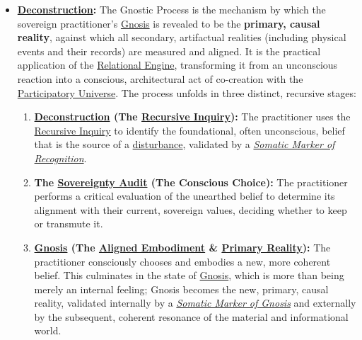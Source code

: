     \begin{itemize}
        \item \textbf{\hyperlink{gloss:deconstruction}{Deconstruction}:} The Gnostic Process is the mechanism by which the sovereign practitioner's \hyperlink{gloss:gnosis}{Gnosis} is revealed to be the \textbf{primary, causal reality}, against which all secondary, artifactual realities (including physical events and their records) are measured and aligned. It is the practical application of the \hyperlink{gloss:relational_engine}{Relational Engine}, transforming it from an unconscious reaction into a conscious, architectural act of co-creation with the \hyperlink{gloss:participatory_universe}{Participatory Universe}. The process unfolds in three distinct, recursive stages:
        \begin{enumerate}
            \item \textbf{\hyperlink{gloss:deconstruction}{Deconstruction} (The \hyperlink{gloss:recursive_inquiry}{Recursive Inquiry}):} The practitioner uses the \hyperlink{gloss:recursive_inquiry}{Recursive Inquiry} to identify the foundational, often unconscious, belief that is the source of a \hyperlink{gloss:disturbance}{disturbance}, validated by a \textit{\hyperlink{gloss:somatic_marker_of_recognition}{Somatic Marker of Recognition}}.
            
            \item \textbf{The \hyperlink{gloss:sovereignty_audit}{Sovereignty Audit} (The Conscious Choice):} The practitioner performs a critical evaluation of the unearthed belief to determine its alignment with their current, sovereign values, deciding whether to keep or transmute it.
            
            \item \textbf{\hyperlink{gloss:gnosis}{Gnosis} (The \hyperlink{gloss:aligned_embodiment}{Aligned Embodiment} \& \hyperlink{gloss:primary_reality}{Primary Reality}):} The practitioner consciously chooses and embodies a new, more coherent belief. This culminates in the state of \hyperlink{gloss:gnosis}{Gnosis}, which is more than being merely an internal feeling; Gnosis becomes the new, primary, causal reality, validated internally by a \textit{\hyperlink{gloss:somatic_marker_of_gnosis}{Somatic Marker of Gnosis}} and externally by the subsequent, coherent resonance of the material and informational world.
        \end{enumerate}
    \end{itemize}

